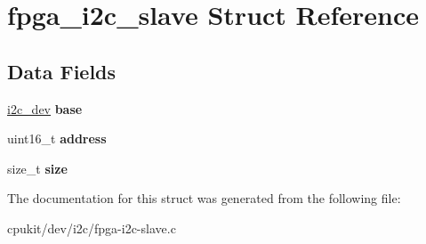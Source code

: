 \hypertarget{structfpga__i2c__slave}{}\section{fpga\+\_\+i2c\+\_\+slave Struct Reference}
\label{structfpga__i2c__slave}
\subsection*{Data Fields}
\begin{DoxyCompactItemize}
\item 
\mbox{\label{structfpga__i2c__slave_af42ee4e699defae2f11e769d009cde65}} 
\mbox{\hyperlink{structi2c__dev}{i2c\+\_\+dev}} {\bfseries base}
\item 
\mbox{\label{structfpga__i2c__slave_a0424cd405b28d3dd5cbd54620947a122}} 
uint16\+\_\+t {\bfseries address}
\item 
\mbox{\label{structfpga__i2c__slave_adb4db08cbc4f755708de4d9c6e75504d}} 
size\+\_\+t {\bfseries size}
\end{DoxyCompactItemize}


The documentation for this struct was generated from the following file\+:\begin{DoxyCompactItemize}
\item 
cpukit/dev/i2c/fpga-\/i2c-\/slave.\+c\end{DoxyCompactItemize}
